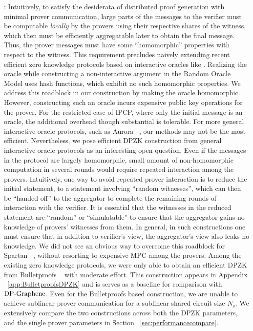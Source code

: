 : Intuitively, to satisfy the desiderata
of distributed proof generation with minimal prover communication, large parts
of the messages to the verifier must be computable {\em locally} by the provers
using their respective shares of the witness, which then must be efficiently 
aggregatable later to obtain the final message. Thus, the prover messages must have some
``homomorphic'' properties with respect to the witness. This requirement
precludes naively extending recent efficient zero knowledge protocols based on
interactive oracles like \cite{ligero,aurora}. Realizing the oracle while constructing a non-interactive
argument in the Random Oracle Model uses hash functions, which exhibit no such
homomorphic properties. We address this roadblock in our construction by making
the oracle homomorphic. However, constructing such an oracle incurs expensive
public key operations for the prover. For the restricted case of IPCP, where
only the initial message is an oracle, the additional overhead though
substantial is tolerable. For more general interactive oracle protocols, such as
Aurora ~\cite{aurora}, our methods may not be the most efficient. Nevertheless,
we pose efficient DPZK construction from general interactive oracle protocols as an
interesting open question. Even if the messages in the protocol are largely
homomorphic, small amount of non-homomorphic computation in several rounds 
would require repeated interaction among the provers. Intuitively, one way to
avoid repeated prover interaction is to reduce the initial statement, to a
statement involving ``random witnesses'', which can then be ``handed off'' to the
aggregator to complete the remaining rounds of interaction with the verifier. It is essential that
the witnesses in the reduced statement are ``random'' or ``simulatable'' to
ensure that the aggregator gains no knowledge of provers' witnesses from them.
In general, in such constructions one must ensure that in addition to verifier's
view, the aggregator's view also leaks no knowledge. We did not see an obvious
way to overcome this roadblock for Spartan ~\cite{spartan}, without resorting to
expensive MPC among the provers. Among the existing zero knowledge protocols, we
were only able to obtain an efficient DPZK from Bulletproofs
~\cite{bulletproofs} with moderate effort. This construction appears in Appendix ~\ref{app:BulletproofsDPZK}
and is serves as a baseline for
comparison with $\text{DP-Graphene}$. Even for the Bulletproofs based construction, we are
unable to achieve sublinear prover communication for a sublinear shared circuit
size $N_s$. We extensively compare the two constructions across both the DPZK
parameters, and the single prover parameters in Section
~\ref{sec:performancecompare}.
  
